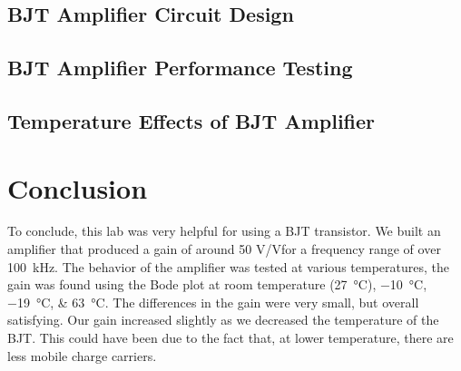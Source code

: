 \documentclass[journal]{IEEEtran}
\begin{document}
\subsection{BJT Amplifier Circuit Design}
\subsection{BJT Amplifier Performance Testing}
\subsection{Temperature Effects of BJT Amplifier}


\section{Conclusion}
\par To conclude, this lab was very helpful for using a BJT transistor. We built an amplifier that produced a gain of around 50 \si{\volt}/\si{\volt}for a frequency range of over \SI{100}{\kilo\hertz}.
The behavior of the amplifier was tested at various temperatures, the gain was found using the Bode plot at room temperature (\SI{27}{\celsius}), \SIlist{-10;-19;63}{\celsius}. The differences in the gain were very small, but overall satisfying. Our gain increased slightly as we decreased the temperature of the BJT. This could have been due to the fact that, at lower temperature, there are less mobile charge carriers.
\end{document}
